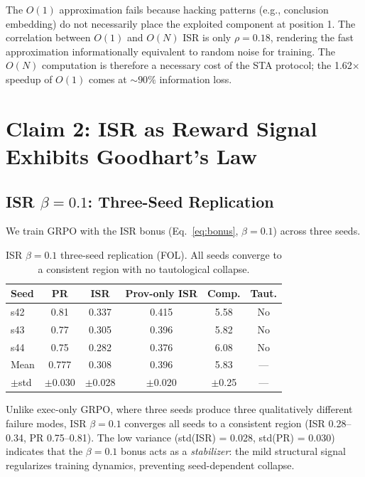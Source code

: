 \documentclass[11pt,twocolumn]{article}
\newcommand{\isr}{\textsc{ISR}}
\newcommand{\sta}{\textsc{STA}}
\newcommand{\pr}{\textsc{PR}}
\newcommand{\grpo}{\textsc{GRPO}}
\begin{document}
The $O(1)$ approximation fails because hacking patterns (e.g., conclusion embedding) do not necessarily place the exploited component at position 1.
The correlation between $O(1)$ and $O(N)$ \isr{} is only $\rho{=}0.18$, rendering the fast approximation informationally equivalent to random noise for training.
The $O(N)$ computation is therefore a necessary cost of the \sta{} protocol; the 1.62$\times$ speedup of $O(1)$ comes at ${\sim}90\%$ information loss.

\section{Claim 2: ISR as Reward Signal Exhibits Goodhart's Law}
\label{sec:claim2}

\subsection{ISR $\beta{=}0.1$: Three-Seed Replication}

We train \grpo{} with the ISR bonus (Eq.~\ref{eq:bonus}, $\beta{=}0.1$) across three seeds.

\begin{table}[h]
\centering
\caption{ISR $\beta{=}0.1$ three-seed replication (FOL). All seeds converge to a consistent region with no tautological collapse.}
\label{tab:isr_3seed}
\small
\begin{tabular}{@{}lccccc@{}}
\toprule
Seed & \pr{} & \isr{} & Prov-only \isr{} & Comp. & Taut. \\
\midrule
s42 & 0.81 & 0.337 & 0.415 & 5.58 & No \\
s43 & 0.77 & 0.305 & 0.396 & 5.82 & No \\
s44 & 0.75 & 0.282 & 0.376 & 6.08 & No \\
\midrule
Mean & 0.777 & 0.308 & 0.396 & 5.83 & --- \\
$\pm$std & $\pm$0.030 & $\pm$0.028 & $\pm$0.020 & $\pm$0.25 & --- \\
\bottomrule
\end{tabular}
\end{table}

Unlike exec-only \grpo{}, where three seeds produce three qualitatively different failure modes, ISR $\beta{=}0.1$ converges all seeds to a consistent region (\isr{} 0.28--0.34, \pr{} 0.75--0.81).
The low variance (std(\isr{}) = 0.028, std(\pr{}) = 0.030) indicates that the $\beta{=}0.1$ bonus acts as a \emph{stabilizer}: the mild structural signal regularizes training dynamics, preventing seed-dependent collapse.
\end{document}
